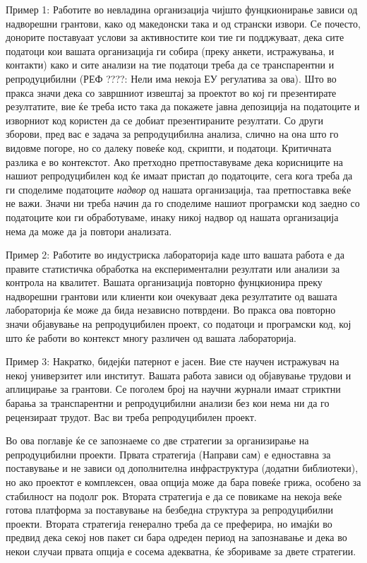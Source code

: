 \documentclass[
]{book}
\begin{document}
Пример 1: Работите во невладина организација чијшто фунцкионирање зависи од надворешни грантови, како од македонски така и од странски извори. Се почесто, донорите поставуаат услови за активностите кои тие ги подджуваат, дека сите податоци кои вашата организација ги собира (преку анкети, истражувања, и контакти) како и сите анализи на тие податоци треба да се транспарентни и репродуцибилни (РЕФ ????: Нели има некоја ЕУ регулатива за ова). Што во пракса значи дека со завршниот извештај за проектот во кој ги презентирате резултатите, вие ќе треба исто така да покажете јавна депозиција на податоците и изворниот код користен да се добиат презентираните резултати. Со други зборови, пред вас е задача за репродуцибилна анализа, слично на она што го видовме погоре, но со далеку повеќе код, скрипти, и податоци. Критичната разлика е во контекстот. Ако претходно претпоставуваме дека корисниците на нашиот репродуцибилен код ќе имаат пристап до податоците, сега кога треба да ги споделиме податоците \emph{надвор} од нашата организација, таа претпоставка веќе не важи. Значи ни треба начин да го споделиме нашиот програмски код заедно со податоците кои ги обработуваме, инаку никој надвор од нашата организација нема да може да ја повтори анализата.

Пример 2: Работите во индустриска лабораторија каде што вашата работа е да правите статистичка обработка на експериментални резултати или анализи за контрола на квалитет. Вашата организација повторно фунцкионира преку надворешни грантови или клиенти кои очекуваат дека резултатите од вашата лабораторија ќе може да бида независно потврдени. Во пракса ова повторно значи објавување на репродуцибилен проект, со податоци и програмски код, кој што ќе работи во контекст многу различен од вашата лабораторија.

Пример 3: Накратко, бидејќи патернот е јасен. Вие сте научен истражувач на некој универзитет или институт. Вашата работа зависи од објавување трудови и аплицирање за грантови. Се поголем број на научни журнали имаат стриктни барања за транспарентни и репродуцибилни анализи без кои нема ни да го рецензираат трудот. Вас ви треба репродуцибилен проект.

Во ова поглавје ќе се запознаеме со две стратегии за организирање на репродуцибилни проекти. Првата стратегија (Направи сам) е едноставна за поставување и не зависи од дополнителна инфраструктура (додатни библиотеки), но ако проектот е комплексен, оваа опција може да бара повеќе грижа, особено за стабилност на подолг рок. Втората стратегија е да се повикаме на некоја веќе готова платформа за поставување на безбедна структура за репродуцибилни проекти. Втората стратегија генерално треба да се преферира, но имајќи во предвид дека секој нов пакет си бара одреден период на запознавање и дека во некои случаи првата опција е сосема адекватна, ќе збориваме за двете стратегии.
\end{document}
